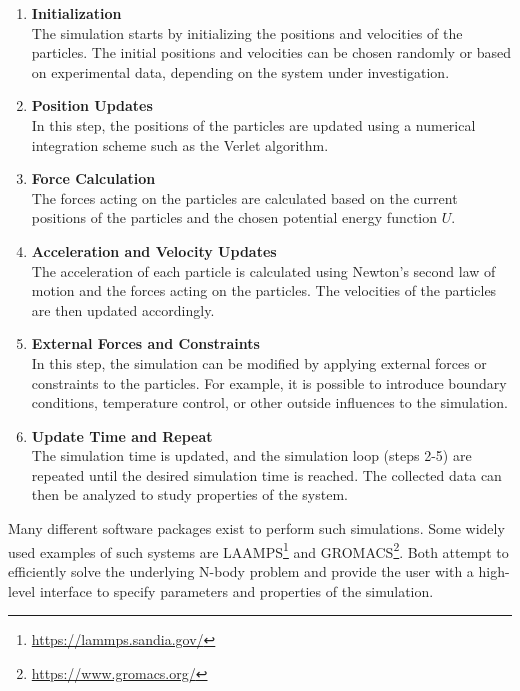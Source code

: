 \begin{enumerate}
      \item \textbf{Initialization} \\
            The simulation starts by initializing the positions and velocities of the particles. The initial positions and velocities can be chosen randomly or based on experimental data, depending on the system under investigation.

      \item \textbf{Position Updates} \\
            In this step, the positions of the particles are updated using a numerical integration scheme such as the Verlet algorithm.

      \item \textbf{Force Calculation} \\
            The forces acting on the particles are calculated based on the current positions of the particles and the chosen potential energy function $U$.

      \item \textbf{Acceleration and Velocity Updates} \\
            The acceleration of each particle is calculated using Newton's second law of motion and the forces acting on the particles. The velocities of the particles are then updated accordingly.

      \item \textbf{External Forces and Constraints} \\
            In this step, the simulation can be modified by applying external forces or constraints to the particles. For example, it is possible to introduce boundary conditions, temperature control, or other outside influences to the simulation.

      \item \textbf{Update Time and Repeat} \\
            The simulation time is updated, and the simulation loop (steps 2-5)
            are repeated until the desired simulation time is reached. The collected data can then be analyzed to study properties of the system.
\end{enumerate}


Many different software packages exist to perform such simulations. Some widely used examples of such systems are LAAMPS\footnote{\url{https://lammps.sandia.gov/}} and GROMACS\footnote{\url{https://www.gromacs.org/}}. Both attempt to efficiently solve the underlying N-body problem and provide the user with a high-level interface to specify parameters and properties of the simulation.


